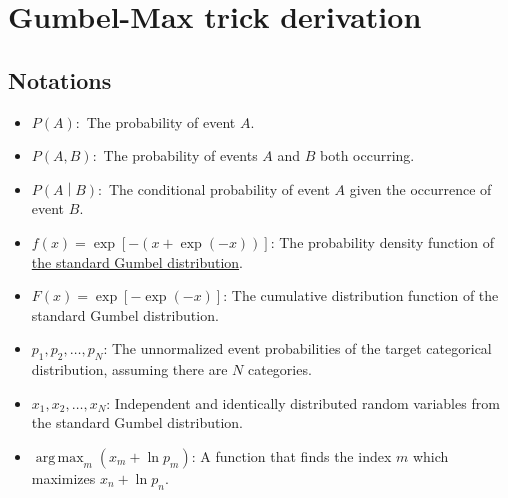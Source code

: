 \documentclass{book}[12pt]
\DeclareMathOperator*{\argmax}{arg\,max}
\begin{document}
\chapter*{Gumbel-Max trick derivation}

\section*{Notations}
\begin{itemize}
    \item $P\left(A\right):$ The probability of event $A$.
    \item $P\left(A,B\right):$ The probability of events $A$ and $B$ both occurring.
    \item $P\left(A\middle|B\right):$ The conditional probability of event $A$ given the occurrence of event $B$.
    \item $f(x)=\exp\left[-\left(x+\exp\left(-x\right)\right)\right]$: The probability density function of \href{https://en.wikipedia.org/wiki/Gumbel_distribution#Standard_Gumbel_distribution}{the standard Gumbel distribution}.
    \item $F(x)=\exp\left[-\exp\left(-x\right)\right]$: The cumulative distribution function of the standard Gumbel distribution.
    \item $p_1,p_2,\dots,p_N$: The unnormalized event probabilities of the target categorical distribution, assuming there are $N$ categories.
    \item $x_1,x_2,\dots,x_N$: Independent and identically distributed random variables from the standard Gumbel distribution.
    \item $\argmax_m\left(x_m+\ln p_m\right)$: A function that finds the index $m$ which maximizes $x_n+\ln p_n$.
\end{itemize}
\end{document}
